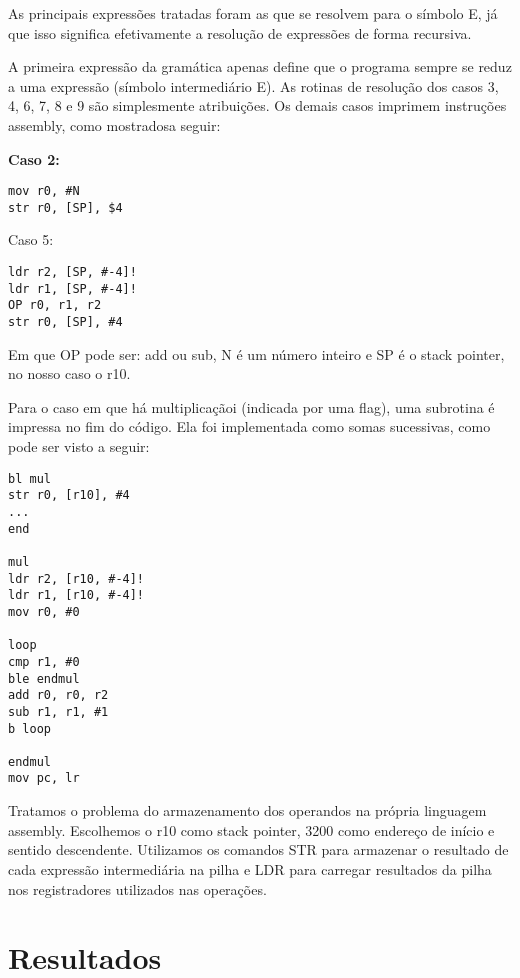 \documentclass[a4paper, 10pt]{article}
\begin{document}
\begin{multicols*}{2}
As principais expressões tratadas foram as que se resolvem para o símbolo E, já que isso significa efetivamente a resolução de expressões de forma recursiva.

    A primeira expressão da gramática apenas define que o programa sempre se reduz a uma expressão (símbolo intermediário E). As rotinas de resolução dos casos 3, 4, 6, 7, 8 e 9 são simplesmente atribuições. Os demais casos imprimem instruções assembly, como mostradosa seguir:

\begin{multicols*}{2}
\bf Caso 2:
\begin{verbatim}
mov r0, #N
str r0, [SP], $4
\end{verbatim}

\break
\vfill

Caso 5:
\begin{verbatim}
ldr r2, [SP, #-4]!
ldr r1, [SP, #-4]!
OP r0, r1, r2
str r0, [SP], #4
\end{verbatim}

\end{multicols*}

Em que OP pode ser: add ou sub, N é um número inteiro e SP é o stack pointer, no nosso caso o r10.

Para o caso em que há multiplicaçãoi (indicada por uma flag), uma subrotina é impressa no fim do código. Ela foi implementada como somas sucessivas, como pode ser visto a seguir:

\begin{multicols*}{2}
\begin{verbatim}
bl mul
str r0, [r10], #4
...
end

mul
ldr r2, [r10, #-4]!
ldr r1, [r10, #-4]!
mov r0, #0

loop
cmp r1, #0
ble endmul
add r0, r0, r2
sub r1, r1, #1
b loop

endmul
mov pc, lr
\end{verbatim}
\end{multicols*}

Tratamos o problema do armazenamento dos operandos na própria linguagem assembly. Escolhemos o r10 como stack pointer, 3200 como endereço de início e sentido descendente. Utilizamos os comandos STR para armazenar o resultado de cada expressão intermediária na pilha e LDR para carregar resultados da pilha nos registradores utilizados nas operações.

\section*{Resultados}


\end{multicols*}
\end{document}

